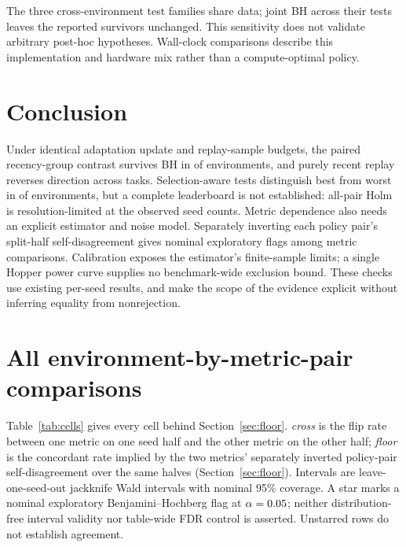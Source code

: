 \documentclass{article}
\begin{document}
The three cross-environment test families share data; joint BH across their
\JointNTests{} tests leaves the reported survivors unchanged. This sensitivity
does not validate arbitrary post-hoc hypotheses. Wall-clock comparisons
describe this implementation and hardware mix rather than a compute-optimal
policy.

\section{Conclusion}

Under identical adaptation update and replay-sample budgets, the paired
recency-group contrast survives BH in \ContrastBH{} of \ContrastNTests{}
environments, and purely recent replay reverses direction across tasks.
Selection-aware tests distinguish best from worst in \ExtremesBH{} of
\NEnv{} environments, but a complete leaderboard is not established:
all-pair Holm is resolution-limited at the observed seed counts.
Metric dependence also needs an explicit estimator and noise model.
Separately inverting each policy pair's split-half self-disagreement gives
\NBH{} nominal exploratory flags among \NTests{} metric comparisons.
Calibration exposes the estimator's finite-sample limits; a single Hopper
power curve supplies no benchmark-wide exclusion bound. These checks use
existing per-seed results, and make the scope of the evidence explicit
without inferring equality from nonrejection.




\appendix

\section{All environment-by-metric-pair comparisons}
\label{app:cells}

Table~\ref{tab:cells} gives every cell behind Section~\ref{sec:floor}.
\emph{cross} is the flip rate between one metric on one seed half and the other
metric on the other half; \emph{floor} is the concordant rate implied by the
two metrics' separately inverted policy-pair self-disagreement over the same halves
(Section~\ref{sec:floor}). Intervals are leave-one-seed-out
jackknife Wald intervals with nominal 95\% coverage. A star marks a nominal
exploratory Benjamini--Hochberg flag at $\alpha = 0.05{}$; neither
distribution-free interval validity nor table-wide FDR control is asserted.
Unstarred rows do not establish agreement.
\end{document}
